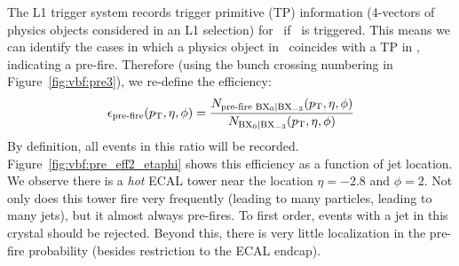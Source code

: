 The L1 trigger system records trigger primitive (TP) information (4-vectors of physics objects considered in an L1 selection) for ~if ~is triggered.
This means we can identify the cases in which a physics object in ~coincides with a TP in , indicating a pre-fire. 
Therefore (using the bunch crossing numbering in Figure~\ref{fig:vbf:pre3}), we re-define the efficiency:
\begin{equation}
    \epsilon_\text{pre-fire}(p_\mathrm{T},\eta,\phi) = \frac{N_\text{pre-fire \ensuremath{{\mathrm{BX}_{0}}}|\ensuremath{{\mathrm{BX}_{-3}}}}(p_\mathrm{T},\eta,\phi)}{N_\text{\ensuremath{{\mathrm{BX}_{0}}}|\ensuremath{{\mathrm{BX}_{-3}}}}(p_\mathrm{T},\eta,\phi)}
\end{equation}
By definition, all events in this ratio will be recorded. 
Figure~\ref{fig:vbf:pre_eff2_etaphi} shows this efficiency as a function of jet location. 
We observe there is a \emph{hot} ECAL tower near the location $\eta=-2.8$ and $\phi=2$.
Not only does this tower fire very frequently (leading to many particles, leading to many jets), but it almost always pre-fires.
To first order, events with a jet in this crystal should be rejected.
Beyond this, there is very little localization in the pre-fire probability (besides restriction to the ECAL endcap). 

